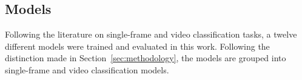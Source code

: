 \documentclass[a4paper]{article}
\begin{document}
% 
% 
% 
% 
% 
% 
% 
% 



\subsection{Models} %
\label{sub:models}


Following the literature on single-frame and video classification tasks, a
twelve different models were trained and evaluated in this work. Following the
distinction made in Section~\ref{sec:methodology}, the models are grouped into
single-frame and video classification models. 
\end{document}
